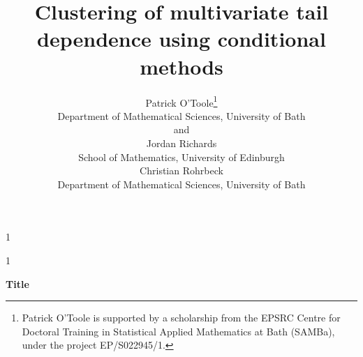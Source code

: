 \documentclass[
  12pt]{article}
\newcommand{\anon}{1}
\begin{document}
\def\spacingset#1{\renewcommand{\baselinestretch}%
{#1}\small\normalsize} \spacingset{1}




\anon
{
  \title{\bf Clustering of multivariate tail dependence using conditional methods}
  \author{Patrick O'Toole\thanks{
  Patrick O'Toole is supported by a scholarship from the EPSRC Centre for Doctoral Training in Statistical Applied Mathematics at Bath (SAMBa), under the project EP/S022945/1.}\hspace{.2cm}\\
    Department of Mathematical Sciences, University of Bath \\
    and \\
    Jordan Richards \\
    School of Mathematics, University of Edinburgh \\
    Christian Rohrbeck \\
    Department of Mathematical Sciences, University of Bath \\
  }
  \maketitle
} \fi

\anon
{
  \bigskip
  \bigskip
  \bigskip
  \begin{center}
    {\LARGE\bf Title}
\end{center}
  \medskip
} \fi

\end{document}
